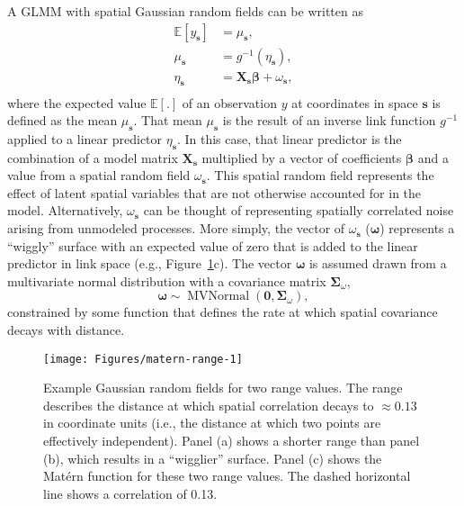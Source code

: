 \documentclass[article]{jss}\usepackage[]{graphicx}\usepackage[dvipsnames]{xcolor}
\begin{document}
A GLMM with spatial Gaussian random fields can be written as
\[
\begin{aligned}
\mathbb{E}[y_{\bm{s}}] &= \mu_{\bm{s}},\\
\mu_{\bm{s}} &=
g^{-1} \left( \eta_{\bm{s}} \right),\\
\eta_{\bm{s}} &= \bm{X}_{\bm{s}} \bm{\beta} + \omega_{\bm{s}},\\
\end{aligned}
\]
where the expected value $\mathbb{E}[.]$ of an observation $y$ at coordinates in space $\bm{s}$ is defined as the mean $\mu_{\bm{s}}$.
That mean $\mu_{\bm{s}}$ is the result of an inverse link function $g^{-1}$ applied to a linear predictor $\eta_{\bm{s}}$.
In this case, that linear predictor is the combination of a model matrix $\bm{X}_{\bm{s}}$ multiplied by a vector of coefficients $\bm{\beta}$ and a value from a spatial random field $\omega_{\bm{s}}$.
This spatial random field represents the effect of latent spatial variables that are not otherwise accounted for in the model.
Alternatively, $\omega_{\bm{s}}$ can be thought of representing spatially correlated noise arising from unmodeled processes.
More simply, the vector of $\omega_{\bm{s}}$ ($\bm{\omega}$) represents a ``wiggly'' surface with an expected value of zero that is added to the linear predictor in link space (e.g., Figure~\ref{fig:matern-range}c).
The vector $\bm{\omega}$ is assumed drawn from a multivariate normal distribution with a covariance matrix $\boldsymbol{\Sigma}_\omega$,
\[
\boldsymbol{\omega} \sim \operatorname{MVNormal}
  \left( \boldsymbol{0}, \boldsymbol{\Sigma}_\omega \right),
\]
constrained by some function that defines the rate at which spatial covariance decays with distance.

\begin{Schunk}
\begin{figure}[ht]

{\centering \texttt{[image: Figures/matern-range-1]} 

}

\caption[Example Gaussian random fields for two range values]{Example Gaussian random fields for two range values. The range describes the distance at which spatial correlation decays to $\approx 0.13$ in coordinate units (i.e., the distance at which two points are effectively independent). Panel (a) shows a shorter range than panel (b), which results in a ``wigglier'' surface. Panel (c) shows the Mat\'ern function for these two range values. The dashed horizontal line shows a correlation of 0.13.}\label{fig:matern-range}
\end{figure}
\end{Schunk}
\end{document}
